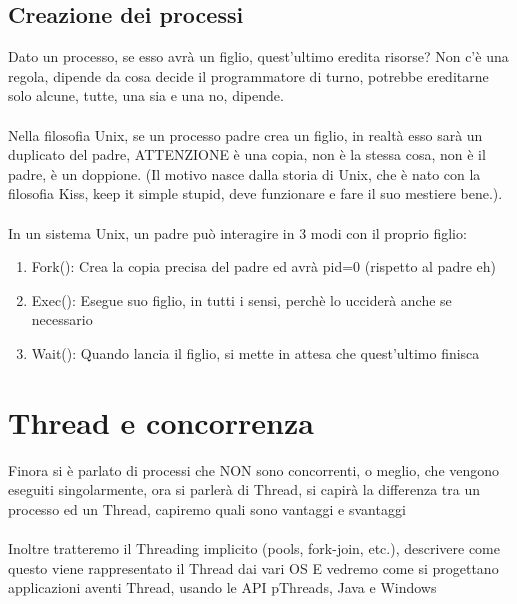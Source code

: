 \documentclass[12pt, a4paper, openany, twoside]{book}
\begin{document}
\section{Creazione dei processi}
Dato un processo, se esso avrà un figlio, quest'ultimo eredita risorse? Non c'è
una regola, dipende da cosa decide il programmatore di turno, potrebbe ereditarne
solo alcune, tutte, una sia e una no, dipende.
\\ \\
Nella filosofia Unix, se un processo padre crea un figlio, in realtà esso
sarà un duplicato del padre, ATTENZIONE è una copia, non è la stessa cosa, non è
il padre, è un doppione. (Il motivo nasce dalla storia di Unix, che è nato con
la filosofia Kiss, keep it simple stupid, deve funzionare e fare il suo mestiere
bene.).\\ \\
In un sistema Unix, un padre può interagire in 3 modi con il proprio figlio:
\begin{enumerate}
	\item Fork(): Crea la copia precisa del padre ed avrà pid=0 (rispetto al padre eh)
	\item Exec(): Esegue suo figlio, in tutti i sensi, perchè lo ucciderà anche se necessario
	\item Wait(): Quando lancia il figlio, si mette in attesa che quest'ultimo finisca
\end{enumerate} 
\chapter{Thread e concorrenza}
Finora si è parlato di processi che NON sono concorrenti, o meglio, che vengono
eseguiti singolarmente, ora si parlerà di Thread, si capirà la differenza tra
un processo ed un Thread, capiremo quali sono vantaggi e svantaggi\\ \\
Inoltre tratteremo il Threading implicito (pools, fork-join, etc.), descrivere
come questo viene rappresentato il Thread dai vari OS E vedremo come si 
progettano applicazioni aventi Thread, usando le API pThreads, Java e Windows
\end{document}
